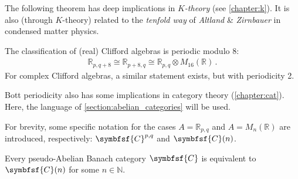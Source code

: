     The following theorem has deep implications in \textit{$K$-theory} (see  \cref{chapter:k}). It is also (through $K$-theory) related to the \textit{tenfold way} of \textit{Altland} \& \textit{Zirnbauer} in condensed matter physics.
    \begin{theorem}\label{clifford:bott_periodicity}
        The classification of (real) Clifford algebras is periodic modulo 8:
        \begin{gather}
            \mathbb{R}_{p,q+8}\cong\mathbb{R}_{p+8,q}\cong\mathbb{R}_{p,q}\otimes M_{16}(\mathbb{R})\,.
        \end{gather}
        For complex Clifford algebras, a similar statement exists, but with periodicity 2.
    \end{theorem}

    Bott periodicity also has some implications in category theory (\cref{chapter:cat}). Here, the language of \cref{section:abelian_categories} will be used.
    \begin{notation}
        For brevity, some specific notation for the cases $A=\mathbb{R}_{p,q}$ and $A=M_n(\mathbb{R})$ are introduced, respectively: $\symbfsf{C}^{p,q}$ and $\symbfsf{C}(n)$.
    \end{notation}

    \begin{property}
        Every pseudo-Abelian Banach category $\symbfsf{C}$ is equivalent to $\symbfsf{C}(n)$ for some $n\in\mathbb{N}$.
    \end{property}


